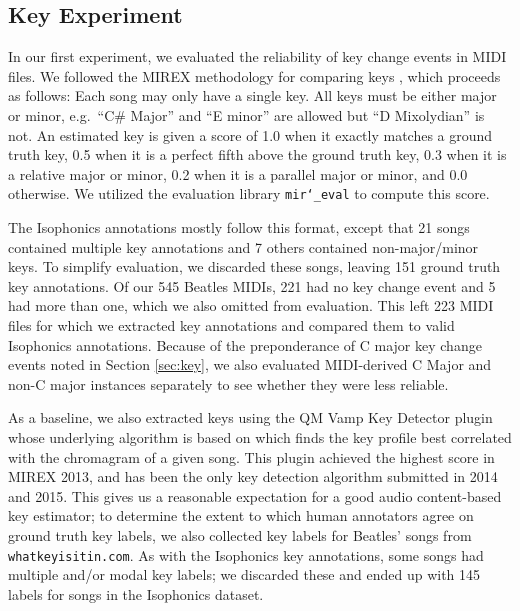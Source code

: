 \documentclass{article}
\begin{document}
\subsection{Key Experiment}

In our first experiment, we evaluated the reliability of key change events in MIDI files.
We followed the MIREX methodology for comparing keys \cite{ehmann2016mirex}, which proceeds as follows:
Each song may only have a single key.
All keys must be either major or minor, e.g.\ ``C\# Major'' and ``E minor'' are allowed but ``D Mixolydian'' is not.
An estimated key is given a score of 1.0 when it exactly matches a ground truth key, 0.5 when it is a perfect fifth above the ground truth key, 0.3 when it is a relative major or minor, 0.2 when it is a parallel major or minor, and 0.0 otherwise.
We utilized the evaluation library \texttt{mir\char`_eval} \cite{raffel2014mir_eval} to compute this score.

The Isophonics annotations mostly follow this format, except that 21 songs contained multiple key annotations and 7 others contained non-major/minor keys.
To simplify evaluation, we discarded these songs, leaving 151 ground truth key annotations.
Of our 545 Beatles MIDIs, 221 had no key change event and 5 had more than one, which we also omitted from evaluation.
This left 223 MIDI files for which we extracted key annotations and compared them to valid Isophonics annotations.
Because of the preponderance of C major key change events noted in Section \ref{sec:key}, we also evaluated MIDI-derived C Major and non-C major instances separately to see whether they were less reliable.

As a baseline, we also extracted keys using the QM Vamp Key Detector plugin \cite{cannam2015mirex} whose underlying algorithm is based on \cite{noland2007signal} which finds the key profile best correlated with the chromagram of a given song.
This plugin achieved the highest score in MIREX 2013, and has been the only key detection algorithm submitted in 2014 and 2015.
This gives us a reasonable expectation for a good audio content-based key estimator; to determine the extent to which human annotators agree on ground truth key labels, we also collected key labels for Beatles' songs from \texttt{whatkeyisitin.com}.
As with the Isophonics key annotations, some songs had multiple and/or modal key labels; we discarded these and ended up with 145 labels for songs in the Isophonics dataset.
\end{document}
